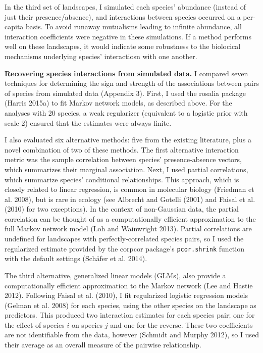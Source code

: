 \documentclass[12pt,]{article}
\begin{document}
\begin{spacing}{1.9}
\begin{flushleft}
In the third set of landscapes, I simulated each species' abundance
(instead of just their presence/absence), and interactions between
species occurred on a per-capita basis. To avoid runaway mutualisms
leading to infinite abundance, all interaction coefficients were
negative in these simulations. If a method performs well on these
landscapes, it would indicate some robustness to the biolocical
mechanisms underlying species' interactiosn with one another.

\noindent \textbf{Recovering species interactions from simulated data.}
I compared seven techniques for determining the sign and strength of the
associations between pairs of species from simulated data (Appendix 3).
First, I used the rosalia package (Harris 2015a) to fit Markov network
models, as described above. For the analyses with 20 species, a weak
regularizer (equivalent to a logistic prior with scale 2) ensured that
the estimates were always finite.

I also evaluated six alternative methods: five from the existing
literature, plus a novel combination of two of these methods. The first
alternative interaction metric was the sample correlation between
species' presence-absence vectors, which summarizes their marginal
association. Next, I used partial correlations, which summarize species'
conditional relationships. This approach, which is closely related to
linear regression, is common in molecular biology (Friedman et al.
2008), but is rare in ecology (see Albrecht and Gotelli (2001) and
Faisal et al. (2010) for two exceptions). In the context of non-Gaussian
data, the partial correlation can be thought of as a computationally
efficient approximation to the full Markov network model (Loh and
Wainwright 2013). Partial correlations are undefined for landscapes with
perfectly-correlated species pairs, so I used the regularized estimate
provided by the corpcor package's \texttt{pcor.shrink} function with the
default settings (Schäfer et al. 2014).

The third alternative, generalized linear models (GLMs), also provide a
computationally efficient approximation to the Markov network (Lee and
Hastie 2012). Following Faisal et al. (2010), I fit regularized logistic
regression models (Gelman et al. 2008) for each species, using the other
species on the landscape as predictors. This produced two interaction
estimates for each species pair; one for the effect of species \(i\) on
species \(j\) and one for the reverse. These two coefficients are not
identifiable from the data, however (Schmidt and Murphy 2012), so I used
their average as an overall measure of the pairwise relationship.


\end{flushleft}
\end{spacing}
\end{document}
